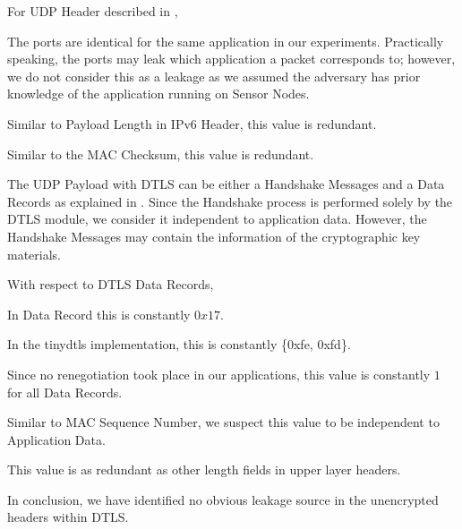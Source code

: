 For UDP Header described in ,

\begin{description}[style=nextline]
	\item[Source and Destination Port]
	The ports are identical for the same application in our experiments. Practically speaking, the ports may leak which application a packet corresponds to; however, we do not consider this as a leakage as we assumed the adversary has prior knowledge of the application running on Sensor Nodes.
	\item[Payload Length]
	Similar to Payload Length in IPv6 Header, this value is redundant.
	\item[Checksum]
	Similar to the MAC Checksum, this value is redundant.
\end{description}

The UDP Payload with DTLS can be either a Handshake Messages and a Data Records as explained in  . Since the Handshake process is performed solely by the DTLS module, we consider it independent to application data. However,  the Handshake Messages may contain the information of the cryptographic key materials.

With respect to DTLS Data Records,

\begin{description}[style=nextline]
	\item[Content Type]
	In Data Record this is constantly $0x17$.
	\item[Protocol Version]
	In the tinydtls implementation, this is constantly \{0xfe, 0xfd\}.
	\item[Epoch]
	Since no renegotiation took place in our applications, this value is constantly $1$ for all Data Records.
	\item[Sequence Number]
	Similar to MAC Sequence Number, we suspect this value to be independent to Application Data.
	\item[Length]
	This value is as redundant as other length fields in upper layer headers.
\end{description}

In conclusion, we have identified no obvious leakage source in the unencrypted headers within DTLS.